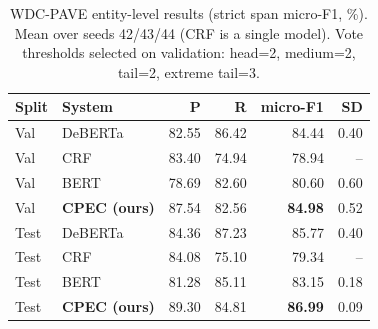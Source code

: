 \begin{table}[t]\centering\small
\begin{tabular}{llrrrr}\toprule
Split & System & P & R & micro-F1 & SD \\\midrule
Val & DeBERTa & 82.55 & 86.42 & 84.44 & 0.40 \\
Val & CRF & 83.40 & 74.94 & 78.94 & -- \\
Val & BERT & 78.69 & 82.60 & 80.60 & 0.60 \\
Val & \textbf{CPEC (ours)} & 87.54 & 82.56 & \textbf{84.98} & 0.52 \\
\midrule
Test & DeBERTa & 84.36 & 87.23 & 85.77 & 0.40 \\
Test & CRF & 84.08 & 75.10 & 79.34 & -- \\
Test & BERT & 81.28 & 85.11 & 83.15 & 0.18 \\
Test & \textbf{CPEC (ours)} & 89.30 & 84.81 & \textbf{86.99} & 0.09 \\
\bottomrule\end{tabular}
\caption{WDC-PAVE entity-level results (strict span micro-F1, \%). Mean over seeds 42/43/44 (CRF is a single model). Vote thresholds selected on validation: head=2, medium=2, tail=2, extreme tail=3.}\label{tab:cpec_wdc}\end{table}
